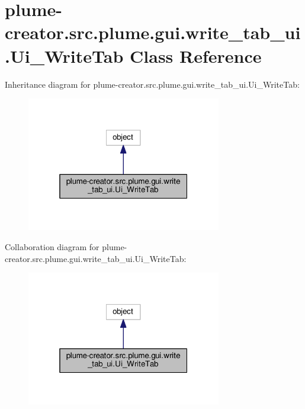 \hypertarget{classplume-creator_1_1src_1_1plume_1_1gui_1_1write__tab__ui_1_1_ui___write_tab}{}\section{plume-\/creator.src.\+plume.\+gui.\+write\+\_\+tab\+\_\+ui.\+Ui\+\_\+\+Write\+Tab Class Reference}
\label{classplume-creator_1_1src_1_1plume_1_1gui_1_1write__tab__ui_1_1_ui___write_tab}


Inheritance diagram for plume-\/creator.src.\+plume.\+gui.\+write\+\_\+tab\+\_\+ui.\+Ui\+\_\+\+Write\+Tab\+:\nopagebreak
\begin{figure}[H]
\begin{center}
\leavevmode
\includegraphics[width=241pt]{classplume-creator_1_1src_1_1plume_1_1gui_1_1write__tab__ui_1_1_ui___write_tab__inherit__graph}
\end{center}
\end{figure}


Collaboration diagram for plume-\/creator.src.\+plume.\+gui.\+write\+\_\+tab\+\_\+ui.\+Ui\+\_\+\+Write\+Tab\+:\nopagebreak
\begin{figure}[H]
\begin{center}
\leavevmode
\includegraphics[width=241pt]{classplume-creator_1_1src_1_1plume_1_1gui_1_1write__tab__ui_1_1_ui___write_tab__coll__graph}
\end{center}
\end{figure}
